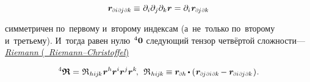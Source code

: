 \begin{otherlanguage}{russian}
\nopagebreak\vspace{-0.25em}
\begin{equation}
\locationvector_{\differentialindex{i}\hspace{.2ex}\differentialindex{\hspace{-0.1ex}j}\hspace{.2ex}\differentialindex{k}} \hspace{-0.1ex} \equiv \hspace{.1ex} \partial_i \partial_j \partial_k \locationvector
= \partial_i \hspace{.12ex} \locationvector_{\differentialindex{\hspace{-0.1ex}j}\hspace{.2ex}\differentialindex{k}}
\end{equation}

\vspace{-0.24em} \noindent
симметричен по~первому и~второму индексам (а~не~только по~второму и~третьему).
И~тогда равен нулю~${\hspace{-0.16ex}^4\bm{0}}$ следующий тензор четвёртой сложности\:---
\href{https://en.wikipedia.org/wiki/Riemann_curvature_tensor}{ \emph{Riemann} (~\emph{Riemann\hbox{--}Christoffel}) }

\nopagebreak\vspace{-0.1em}\begin{equation}\label{riemanncurvaturetensor}
{^4\bm{\mathfrak{R}}} = \hspace{.12ex} \mathfrak{R}_{\hspace{.1ex}hi\hspace{-0.1ex}j\hspace{-0.1ex}k} \hspace{.12ex} \locationvector^h \locationvector^i \locationvector^j \locationvector^k \hspace{-0.25ex},
\:\:
\mathfrak{R}_{\hspace{.1ex}hi\hspace{-0.1ex}j\hspace{-0.1ex}k} \hspace{-0.12ex}
\equiv
\locationvector_\differentialindex{h} \hspace{-0.15ex} \dotp \left( \hspace{.12ex} \locationvector_{\differentialindex{\hspace{-0.1ex}j}\hspace{.2ex}\differentialindex{i}\hspace{.2ex}\differentialindex{k}} \hspace{-0.2ex} - \locationvector_{\differentialindex{i}\hspace{.2ex}\differentialindex{\hspace{-0.1ex}j}\hspace{.2ex}\differentialindex{k}} \hspace{.12ex} \right)
\hspace{-0.3ex} .
\end{equation}


\end{otherlanguage}

